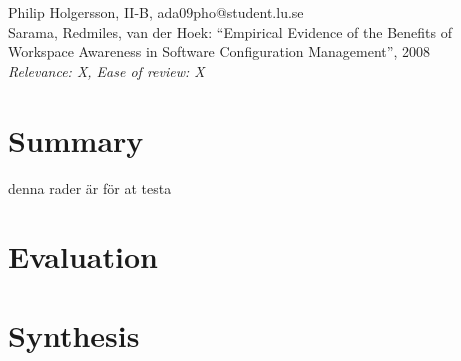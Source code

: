 \documentclass[a4paper]{article}
\begin{document}

Philip Holgersson, II-B, ada09pho@student.lu.se\\
Sarama, Redmiles, van der Hoek: ``Empirical Evidence of the Benefits of Workspace Awareness in Software Configuration Management'', 2008 \\
\textit{Relevance: X, Ease of review: X}

\section*{Summary}
denna rader är för at testa
\section*{Evaluation}



\section*{Synthesis}
\end{document}
